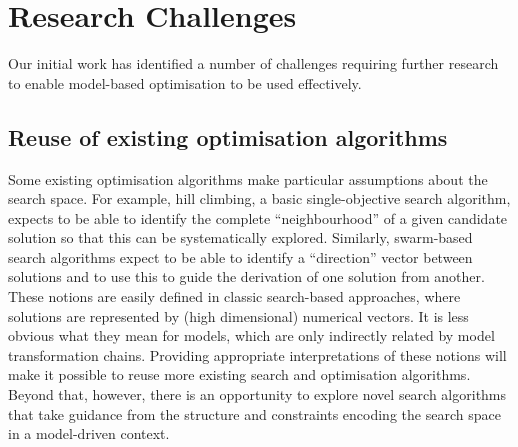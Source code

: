 \section{Research Challenges}
\label{section:research_challenges}


  Our initial work has identified a number of challenges requiring further research to enable model-based optimisation to be used effectively.
	
	\subsection{Reuse of existing optimisation algorithms}
	
		Some existing optimisation algorithms make particular assumptions about the search space. For example, hill climbing, a basic single-objective search algorithm,
		expects to be able to identify the complete ``neighbourhood'' of a given candidate solution so that this can be systematically explored. Similarly, swarm-based
		search algorithms expect to be able to identify a ``direction'' vector between solutions and to use this to guide the derivation of one solution from another.
		These notions are easily defined in classic search-based approaches, where solutions are represented by (high dimensional) numerical vectors. It is less obvious
		what they mean for models, which are only indirectly related by model transformation chains. Providing appropriate interpretations of these notions will make it
		possible to reuse more existing search and optimisation algorithms. Beyond that, however, there is an opportunity to explore novel search algorithms that take
		guidance from the structure and constraints encoding the search space in a model-driven context.
	
